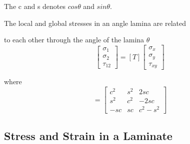 \documentclass[USenglish,twocolumn]{article}
\begin{document}
The c and s denotes $cos\theta $ and $sin\theta $.

The local and global stresses in an angle lamina are related

to each other through the angle of the lamina $\theta $
\begin{equation}\left[\begin{array}{l}\sigma _{1} \\ \sigma _{2} \\ \tau_{12}\end{array}\right]=[T]\left[\begin{array}{l}\sigma _{x} \\ \sigma _{y} \\\tau_{xy}\end{array}\right]
\end{equation}

where
\begin{equation}[T]=\left[\begin{array}{ccc}c^{2} & s^{2} & 2 s c \\ s^{2} & c^{2} & -2 s c \\ -s c & s c &c^{2}-s^{2}\end{array}\right] 
\end{equation}



\subsection{Stress and Strain in a Laminate}
\end{document}
